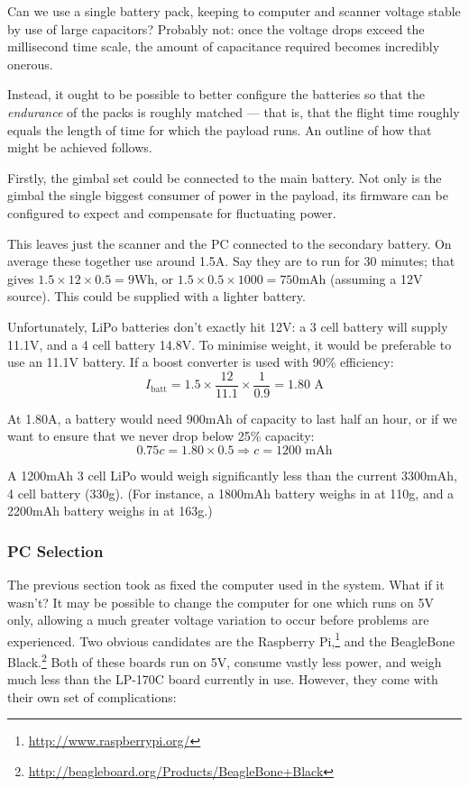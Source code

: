 \documentclass[12pt,oneside,a4paper]{book}
\begin{document}
Can we use a single battery pack, keeping to computer and scanner
voltage stable by use of large capacitors? Probably not: once the
voltage drops exceed the millisecond time scale, the amount of
capacitance required becomes incredibly onerous.

Instead, it ought to be possible to better configure the batteries so
that the \emph{endurance} of the packs is roughly matched --- that is,
that the flight time roughly equals the length of time for which the
payload runs. An outline of how that might be achieved follows.

Firstly, the gimbal set could be connected to the main battery. Not
only is the gimbal the single biggest consumer of power in the
payload, its firmware can be configured to expect and compensate for
fluctuating power.

This leaves just the scanner and the PC connected to the secondary
battery. On average these together use around 1.5A.  Say they are to
run for 30 minutes; that gives $1.5 \times 12 \times 0.5 = 9$Wh, or
$1.5 \times 0.5 \times 1000 = 750$mAh (assuming a 12V source). This
could be supplied with a lighter battery.

Unfortunately, LiPo batteries don't exactly hit 12V: a 3 cell battery
will supply 11.1V, and a 4 cell battery 14.8V. To minimise weight, it
would be preferable to use an 11.1V battery. If a boost converter is
used with 90\% efficiency:
\begin{equation}
  \label{eq:2}
  I_{\text{batt}} = 1.5 \times \frac{12}{11.1} \times \frac{1}{0.9} =
  1.80 \text{ A}
\end{equation}

At 1.80A, a battery would need 900mAh of capacity to last half an
hour, or if we want to ensure that we never drop below 25\% capacity:
\begin{equation}
  \label{eq:3}
  0.75c = 1.80 \times 0.5 \Rightarrow c = 1200 \text{ mAh}
\end{equation}

A 1200mAh 3 cell LiPo would weigh significantly less than the current
3300mAh, 4 cell battery (330g). (For instance, a 1800mAh battery weighs
in at 110g, and a 2200mAh battery weighs in at 163g.)

\subsubsection{PC Selection}
\label{sec:electr-gener}

The previous section took as fixed the computer used in the
system. What if it wasn't? It may be possible to change the computer
for one which runs on 5V only, allowing a much greater voltage
variation to occur before problems are experienced. Two obvious
candidates are the Raspberry
Pi,\footnote{\url{http://www.raspberrypi.org/}} and the BeagleBone
Black.\footnote{\url{http://beagleboard.org/Products/BeagleBone+Black}}
Both of these boards run on 5V, consume vastly less power, and weigh
much less than the LP-170C board currently in use. However, they come
with their own set of complications:
\end{document}
